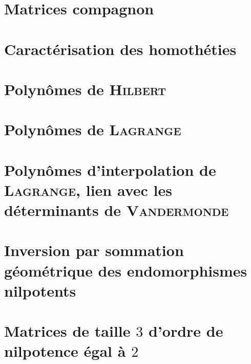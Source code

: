 \section{Matrices compagnon}


\section{Caractérisation des homothéties}


\section{Polynômes de \textsc{Hilbert}} \label{polynome_hilbert}


\section{Polynômes de \textsc{Lagrange}} 


\section{Polynômes d'interpolation de \textsc{Lagrange}, lien avec les déterminants de \textsc{Vandermonde}}


\section{Inversion par sommation géométrique des endomorphismes nilpotents} 


\section{Matrices de taille \texorpdfstring{$3$}{3} d'ordre de nilpotence égal à \texorpdfstring{$2$}{2}} 


